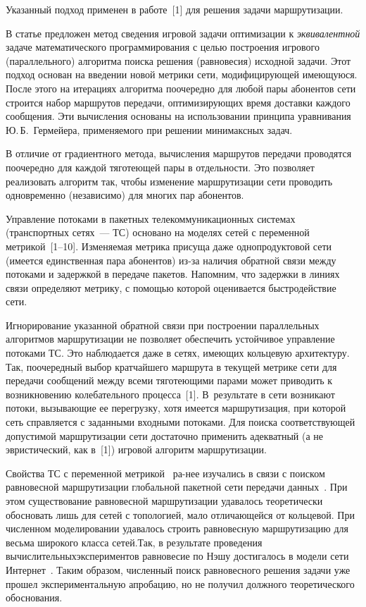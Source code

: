 \begin{multicols}{2}
Указанный 
подход применен в работе~[1] для решения задачи маршрутизации. 
  
  В статье предложен метод сведения игровой задачи оптимизации к 
\textit{эквивалентной} задаче математического программирования с целью 
построения игрового (параллельного) алгоритма поиска решения (равновесия) 
исходной задачи. Этот подход основан на введении новой метрики сети, 
модифицирующей имеющуюся. После этого на итерациях алгоритма поочередно 
для любой пары абонентов сети строится набор маршрутов передачи, 
оптимизирующих время доставки каждого сообщения. Эти вычисления основаны 
на использовании принципа уравнивания Ю.\,Б.~Гермейера, применяемого при 
решении минимаксных задач. 
  
  В отличие от градиентного метода, вычисления маршрутов передачи проводятся 
поочередно для каждой тяготеющей пары в отдельности. Это позволяет реализовать 
алгоритм так, чтобы изменение маршрутизации сети проводить одновременно 
(независимо) для многих пар абонентов.
  
  Управление потоками в пакетных телекоммуникационных системах 
(транспортных сетях~--- ТС) основано на моделях сетей с переменной 
  метрикой~[1--10]. Изменяемая метрика присуща даже однопродуктовой сети 
(имеется единственная пара абонентов) из-за наличия обратной связи между 
потоками и задержкой в передаче пакетов. Напомним, что задержки в линиях связи 
определяют метрику, с помощью которой оценивается быстродействие сети. 
  
  Игнорирование указанной обратной связи при построении параллельных 
алгоритмов маршрутизации не позволяет обеспечить устойчивое управ\-ле\-ние 
потоками ТС. Это наблюдается даже в сетях, имеющих кольцевую архитектуру. 
Так, поочередный выбор кратчайшего маршрута в текущей мет\-ри\-ке сети для 
передачи сообщений между всеми тяготеющими парами может приводить к 
возникновению колебательного процесса~[1]. В~результате в сети возникают 
потоки, вызывающие ее перегрузку, хотя имеется маршрутизация, при которой сеть 
справляется с заданными входными потоками. Для поиска соответствующей 
допустимой маршрутизации сети достаточно применить адекватный (а не 
эвристический, как в~[1]) игровой алгоритм маршрутизации. 
  
  Свойства ТС с переменной метрикой~\cite{10-vasil} ра-\linebreak нее изучались в связи с 
поиском равновесной марш\-рутизации глобальной пакетной сети передачи\linebreak 
данных~\cite{2-vasil, 4-vasil, 7-vasil}. При этом существование равновесной 
маршрутизации удавалось теоретически обосно\-вать лишь для сетей с топологией, 
мало отличающейся от кольцевой. При численном моделировании удавалось 
строить равновесную маршрутизацию для весьма широкого класса сетей.\linebreak Так, в 
результате проведения вы\-чис\-ли\-тель\-ных\linebreak экспериментов равновесие по Нэшу 
достигалось в модели сети Интернет~\cite{7-vasil}. Таким образом, чис\-лен\-ный 
\mbox{поиск} равновесного решения задачи уже прошел экспериментальную апробацию, но 
не получил должного теоретического обоснования. 
  

\end{multicols}
